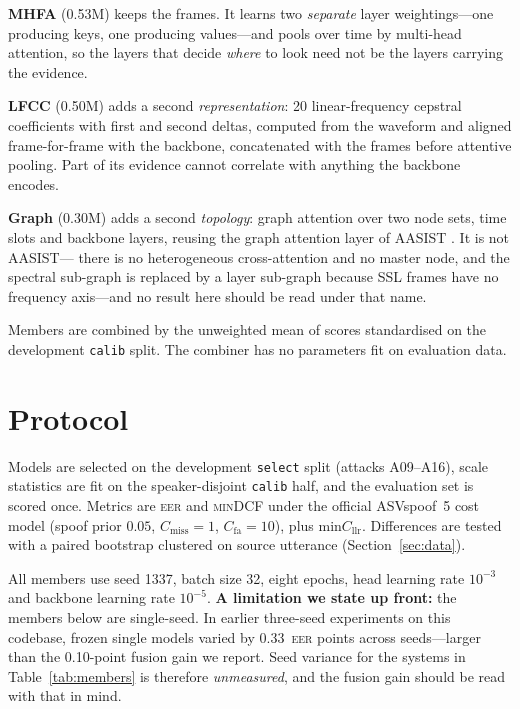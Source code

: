 \documentclass[11pt,a4paper]{article}
\newcommand{\eer}{\textsc{eer}}
\newcommand{\mindcf}{\textsc{minDCF}}
\begin{document}
\textbf{MHFA} (0.53M) keeps the frames. It learns two \emph{separate} layer weightings---one
producing keys, one producing values---and pools over time by multi-head attention, so the layers
that decide \emph{where} to look need not be the layers carrying the evidence.

\textbf{LFCC} (0.50M) adds a second \emph{representation}: 20 linear-frequency cepstral coefficients
with first and second deltas, computed from the waveform and aligned frame-for-frame with the
backbone, concatenated with the frames before attentive pooling. Part of its evidence cannot
correlate with anything the backbone encodes.

\textbf{Graph} (0.30M) adds a second \emph{topology}: graph attention over two node sets, time slots
and backbone layers, reusing the graph attention layer of AASIST \citep{aasist}. It is not AASIST---
there is no heterogeneous cross-attention and no master node, and the spectral sub-graph is replaced
by a layer sub-graph because SSL frames have no frequency axis---and no result here should be read
under that name.

Members are combined by the unweighted mean of scores standardised on the development
\texttt{calib} split. The combiner has no parameters fit on evaluation data.

\section{Protocol}

Models are selected on the development \texttt{select} split (attacks A09--A16), scale statistics are
fit on the speaker-disjoint \texttt{calib} half, and the evaluation set is scored once. Metrics are
\eer{} and \mindcf{} under the official ASVspoof~5 cost model (spoof prior $0.05$, $C_\text{miss}=1$,
$C_\text{fa}=10$), plus $\text{min}C_\text{llr}$. Differences are tested with a paired bootstrap
clustered on source utterance (Section~\ref{sec:data}).

All members use seed 1337, batch size 32, eight epochs, head learning rate $10^{-3}$ and backbone
learning rate $10^{-5}$. \textbf{A limitation we state up front:} the members below are single-seed.
In earlier three-seed experiments on this codebase, frozen single models varied by 0.33~\eer{} points
across seeds---larger than the 0.10-point fusion gain we report. Seed variance for the systems in
Table~\ref{tab:members} is therefore \emph{unmeasured}, and the fusion gain should be read with that
in mind.
\end{document}
